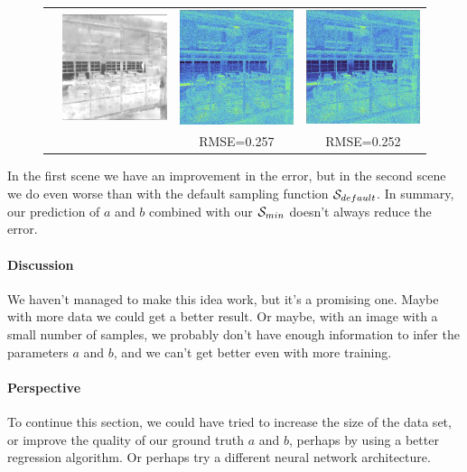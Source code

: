 \documentclass{classeENS}
\begin{document}
\begin{figure}[H]
\begin{tabular}{|c|c|c|c|}
        & \includegraphics[width=35mm]{image/without/ppsm.png}
        & \includegraphics[width=35mm]{image/without/ppp.png}
        & \includegraphics[width=35mm]{image/without/pp_norm.png} \\
         &  & RMSE=0.257 & RMSE=0.252 \\
        \hline
    \end{tabular}
\end{figure}
In the first scene we have an improvement in the error, but in the second scene we 
do even worse than with the default sampling function $\mathcal S_{default}$. In 
summary, our prediction of $a$ and $b$ combined with our $\mathcal S_{min}$ doesn't 
always reduce the error.

\paragraph*{Discussion} We haven't managed to make this idea work, but it's a 
promising one. Maybe with more data we could get a better result. Or maybe, 
with an image with a small number of samples, we probably don't have enough 
information to infer the parameters $a$ and $b$, and we can't get better even 
with more training.

\paragraph*{Perspective} To continue this section, we could have tried to increase 
the size of the data set, or improve the quality of our ground truth 
$a$ and $b$, perhaps by using a better regression algorithm. Or 
perhaps try a different neural network architecture.
\end{document}
